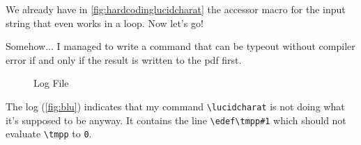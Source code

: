 \documentclass{article} \usepackage[utf8]{inputenc}
\newcommand{\code}[1]{\colorbox{codebggray}{{\texttt{#1}}}}
\begin{document}
  We already have in \autoref{fig:hardcodinglucidcharat} the accessor macro for the input string that even works in a loop. Now let's go!
  
  Somehow... I managed to write a command that can be typeout without compiler error if and only if the result is written to the pdf first.
  
  \begin{figure}[htbp]
\caption{Log File}
\label{fig:blu}
\end{figure}

The log (\autoref{fig:blu}) indicates that my command \code{\textbackslash lucidcharat} is not doing what it's supposed to be anyway. It contains the line \code{\textbackslash edef\textbackslash tmpp{\#1}} which should not evaluate \code{\textbackslash tmpp} to \code{0}.

  
\def\numlayers{\the\numexpr \inputstringlength / \layersize \relax}
\setcounter{charcounter}{0}
\def\workingstr{\fileline}
\newif\ifbreakonunexpected
\breakonunexpectedtrue
\setcounter{fpfctr}{0}
\end{document}
